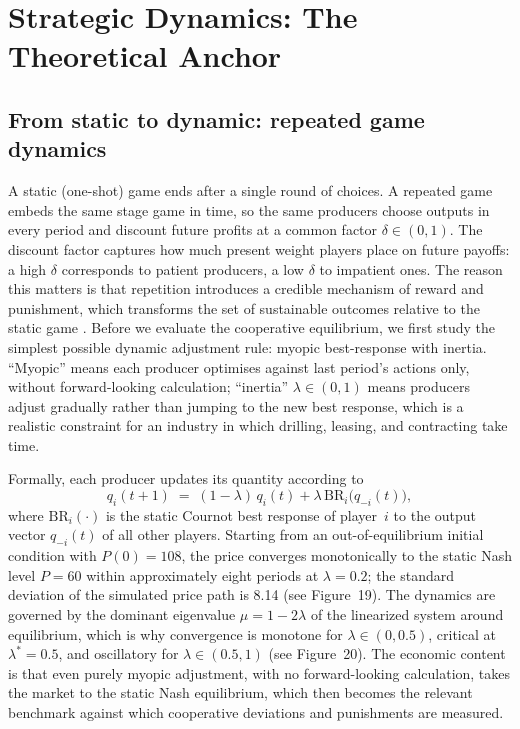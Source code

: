 \section{Strategic Dynamics: The Theoretical Anchor}
\label{sec:dynamics}

\subsection{From static to dynamic: repeated game dynamics}
\label{subsec:repeated}

A static (one-shot) game ends after a single round of choices. A
repeated game embeds the same stage game in time, so the same producers
choose outputs in every period and discount future profits at a common
factor $\delta \in (0,1)$. The discount factor captures how much present
weight players place on future payoffs: a high $\delta$ corresponds to
patient producers, a low $\delta$ to impatient ones. The reason this
matters is that repetition introduces a credible mechanism of reward and
punishment, which transforms the set of sustainable outcomes relative to
the static game \citep{friedman1971,fudenbergmaskin1986}. Before we
evaluate the cooperative equilibrium, we first study the simplest
possible dynamic adjustment rule: myopic best-response with inertia.
``Myopic'' means each producer optimises against last period's actions
only, without forward-looking calculation; ``inertia''
$\lambda \in (0,1)$ means producers adjust gradually rather than jumping
to the new best response, which is a realistic constraint for an
industry in which drilling, leasing, and contracting take time.

Formally, each producer updates its quantity according to
\begin{equation}
q_i(t+1) \;=\; (1 - \lambda)\, q_i(t) + \lambda\, \mathrm{BR}_i\bigl(q_{-i}(t)\bigr),
\label{eq:3}
\end{equation}
where $\mathrm{BR}_i(\cdot)$ is the static Cournot best response of
player~$i$ to the output vector $q_{-i}(t)$ of all other players.
Starting from an out-of-equilibrium initial condition with $P(0) = 108$,
the price converges monotonically to the static Nash level $P = 60$
within approximately eight periods at $\lambda = 0.2$; the standard
deviation of the simulated price path is 8.14 (see Figure~19). The
dynamics are governed by the dominant eigenvalue $\mu = 1 - 2\lambda$ of
the linearized system around equilibrium, which is why convergence is
monotone for $\lambda \in (0, 0.5)$, critical at $\lambda^* = 0.5$, and
oscillatory for $\lambda \in (0.5, 1)$ (see Figure~20). The economic
content is that even purely myopic adjustment, with no forward-looking
calculation, takes the market to the static Nash equilibrium, which then
becomes the relevant benchmark against which cooperative deviations and
punishments are measured.

